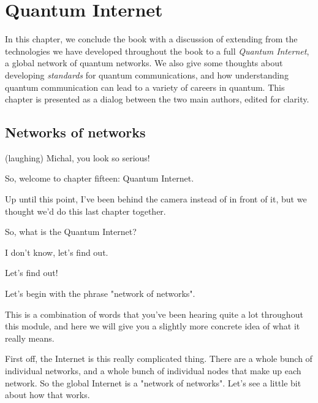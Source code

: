 \chapter{Quantum Internet}

In this chapter, we conclude the book with a discussion of extending from the technologies we have developed throughout the book to a full \emph{Quantum Internet}, a global network of quantum networks. We also give some thoughts about developing \emph{standards} for quantum communications, and how understanding quantum communication can lead to a variety of careers in quantum. This chapter is presented as a dialog between the two main authors, edited for clarity.

\section{Networks of networks}

\rrr (laughing) Michal, you look so serious!

So, welcome to chapter fifteen: Quantum Internet.

Up until this point, I've been behind the camera instead of in front of it, but we thought we'd do this last chapter together.

\mmm So, what is the Quantum Internet?

\rrr I don't know, let's find out. 

\mmm Let's find out!

Let's begin with the phrase "network of networks".

This is a combination of words that you've been hearing quite a lot throughout this module, and here we will give you a slightly more concrete idea of what it really means.

\rrr First off, the Internet is this really complicated thing. There are a whole bunch of individual networks, and a whole bunch of individual nodes that make up each network. So the global Internet is a "network of networks". Let's see a little bit about how that works.

